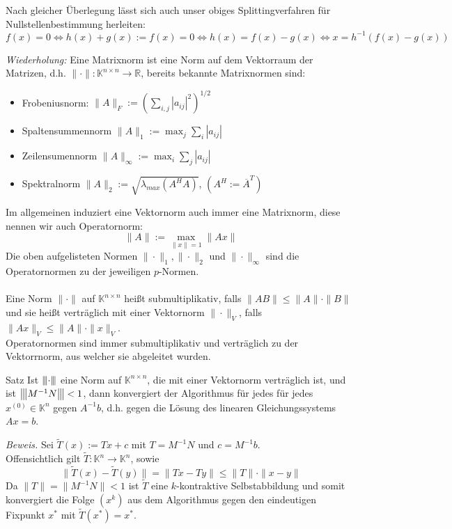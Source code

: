 \documentclass{article}
\begin{document}
\begin{rembox}
    Nach gleicher Überlegung lässt sich auch unser obiges Splittingverfahren für Nullstellenbestimmung herleiten:
    \[f(x)=0\Leftrightarrow h(x)+g(x):=f(x) = 0 \Leftrightarrow h(x)=f(x)-g(x) \Leftrightarrow x=h^{-1}(f(x)-g(x))\]
\end{rembox}
\textit{Wiederholung:} Eine Matrixnorm ist eine Norm auf dem Vektorraum der Matrizen, d.h. $\|\cdot\|:\mathbb{K}^{n\times n}\rightarrow \mathbb{R}$, bereits bekannte Matrixnormen sind:
\begin{itemize}
    \item Frobeniusnorm: $\|A\|_F := \left(\displaystyle \sum_{i,j}|a_{ij}|^2\right)^{1/2}$
    \item Spaltensummennorm $\|A\|_1:=\max_j \sum_i |a_{ij}|$
    \item Zeilensumennorm $\|A\|_\infty:=\max_i \sum_j |a_{ij}|$
    \item Spektralnorm $\|A\|_2:=\sqrt{\lambda_{max}(A^HA)}$, \qquad $(A^H := \overline{A}^T)$
\end{itemize}
Im allgemeinen induziert eine Vektornorm auch immer eine Matrixnorm, diese nennen wir auch Operatornorm:
\[\|A\|:=\max_{\|x\|=1}\|Ax\|\]
Die oben aufgelisteten Normen $\|\cdot\|_1,\|\cdot\|_2$ und $\|\cdot\|_\infty$ sind die Operatornormen zu der jeweiligen $p$-Normen. \\ \\
Eine Norm $\|\cdot\|$ auf $\mathbb{K}^{n\times n}$ heißt submultiplikativ, falls $\|AB\|\leq\|A\|\cdot\|B\|$ und sie heißt verträglich mit einer Vektornorm $\|\cdot\|_V$, falls $\|Ax\|_V\leq \|A\|\cdot\|x\|_V$. \\
Operatornormen sind immer submultiplikativ und verträglich zu der Vektorrnorm, aus welcher sie abgeleitet wurden.
\begin{thmbox}{Satz}
    Ist ${\left\vert\kern-0.25ex\left\vert\kern-0.25ex\left\vert \cdot \right\vert\kern-0.25ex\right\vert\kern-0.25ex\right\vert}$ eine Norm auf $\mathbb{K}^{n\times n}$, die mit einer Vektornorm verträglich ist, und ist ${\left\vert\kern-0.25ex\left\vert\kern-0.25ex\left\vert M^{-1}N \right\vert\kern-0.25ex\right\vert\kern-0.25ex\right\vert}<1$, dann konvergiert der Algorithmus für jedes für jedes $x^{(0)}\in\mathbb{K}^n$ gegen $A^{-1}b$, d.h. gegen die Lösung des linearen Gleichungssystems $Ax=b$.
\end{thmbox}
\textit{Beweis.} Sei $\tilde{T}(x) := Tx + c$ mit $T=M^{-1}N$ und $c=M^{-1}b$.\\
Offensichtlich gilt $\tilde{T}:\mathbb{K}^n\rightarrow\mathbb{K}^n$, sowie 
\[\|\tilde{T}(x)-\tilde{T}(y)\| = \|Tx-Ty\|\leq \|T\|\cdot\|x-y\|\]
Da $\|T\|=\|M^{-1}N\|<1$ ist $\tilde{T}$ eine $k$-kontraktive Selbstabbildung und somit konvergiert die Folge $(x^k)$ aus dem Algorithmus gegen den eindeutigen Fixpunkt $x^*$ mit $\tilde{T}(x^*)=x^*$. \\ 
\end{document}
